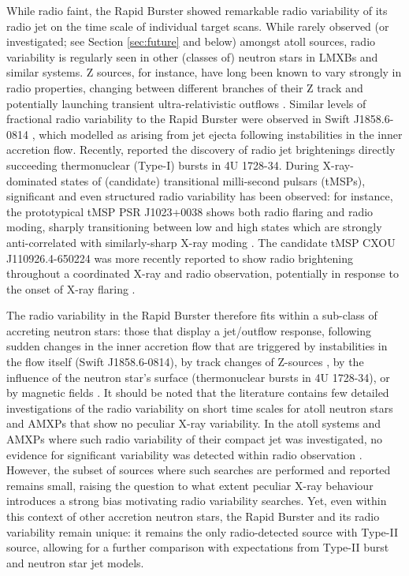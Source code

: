 \documentclass[fleqn,usenatbib]{mnras}
\begin{document}
While radio faint, the Rapid Burster showed remarkable radio variability of its radio jet on the time scale of individual target scans. While rarely observed (or investigated; see Section \ref{sec:future} and below) amongst atoll sources, radio variability is regularly seen in other (classes of) neutron stars in LMXBs and similar systems. Z sources, for instance, have long been known to vary strongly in radio properties, changing between different branches of their Z track \citep{hjellming1990a,hjellming1990b,migliari06} and potentially launching transient ultra-relativistic outflows \citep{fomalont2001a,fomalont2001b,motta2019}. Similar levels of fractional radio variability to the Rapid Burster were observed in Swift J1858.6-0814 \citep{vandeneijnden2020}, which \citet{vincentelli2023} modelled as arising from jet ejecta following instabilities in the inner accretion flow. Recently, \citet{russell2024} reported the discovery of radio jet brightenings directly succeeding thermonuclear (Type-I) bursts in 4U 1728-34. During X-ray-dominated states of (candidate) transitional milli-second pulsars (tMSPs), significant and even structured radio variability has been observed: for instance, the prototypical tMSP PSR J1023+0038 shows both radio flaring and radio moding, sharply transitioning between low and high states which are strongly anti-correlated with similarly-sharp X-ray moding \citep{bogdanov2018}. The candidate tMSP CXOU J110926.4-650224 was more recently reported to show radio brightening throughout a coordinated X-ray and radio observation, potentially in response to the onset of X-ray flaring \citep{cotizelati2021}.  

The radio variability in the Rapid Burster therefore fits within a sub-class of accreting neutron stars: those that display a jet/outflow response, following sudden changes in the inner accretion flow that are triggered by instabilities in the flow itself  (Swift J1858.6-0814), by track changes of Z-sources \citep[][]{penninx1988,hjellming1990a,hjellming1990b}, by the influence of the neutron star's surface (thermonuclear bursts in 4U 1728-34), or by magnetic fields \citep[likely playing a central role in tMSPs; see e.g.,][for a recent review]{papitto2022}. It should be noted that the literature contains few detailed investigations of the radio variability on short time scales for atoll neutron stars and AMXPs that show no peculiar X-ray variability. In the atoll systems and AMXPs where such radio variability of their compact jet was investigated, no evidence for significant variability was detected within radio observation \citep{russell2018,gusinskaia2020b}. However, the subset of sources where such searches are performed and reported remains small, raising the question to what extent peculiar X-ray behaviour introduces a strong bias motivating radio variability searches. Yet, even within this context of other accretion neutron stars, the Rapid Burster and its radio variability remain unique: it remains the only radio-detected source with Type-II source, allowing for a further comparison with expectations from Type-II burst and neutron star jet models. 
\end{document}
